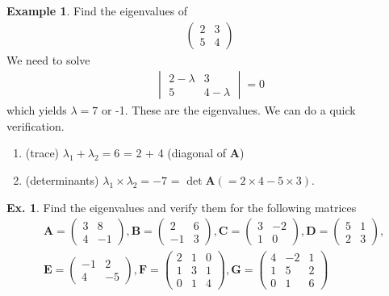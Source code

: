 \documentclass[11pt,a4paper]{book}
\theoremstyle{definition}\newtheorem{definition}{Definition}
\theoremstyle{definition}\newtheorem{fact}{Fact}
\theoremstyle{definition}\newtheorem{remark}{Remark}
\theoremstyle{definition}\newtheorem{ex}{Ex.}
\theoremstyle{definition}\newtheorem{project}{Project}
\theoremstyle{definition}\newtheorem{problem}{Problem}
\theoremstyle{definition}\newtheorem{example}{Example}
\numberwithin{theorem}{section}
\numberwithin{corollary}{chapter}
\numberwithin{assumption}{chapter}
\numberwithin{definition}{chapter}
\numberwithin{prop}{chapter}
\numberwithin{notation}{chapter}
\numberwithin{problem}{chapter}
\numberwithin{example}{chapter}
\numberwithin{fact}{chapter}
\numberwithin{ex}{chapter}
\def\E{\mathbb E}
\def\A{\mathbf A}
\def\B{\mathbf B}
\def\C{\mathbf C}
\def\D{\mathbf D}
\def\E{\mathbf E}
\def\F{\mathbf F}
\def\G{\mathbf G}
\begin{document}
	\begin{example}	
		Find the eigenvalues of 
		\begin{align*}
			\begin{pmatrix}
				2 & 3 \\ 5 & 4
			\end{pmatrix}
		\end{align*}
		We need to solve
		\begin{align*}
			\begin{vmatrix}
				2 - \lambda & 3 \\ 5 & 4-\lambda
			\end{vmatrix} = 0
		\end{align*}
		which yields $\lambda = 7$ or -1. These are the eigenvalues. We can do a quick verification.
		\begin{enumerate}
			\item (trace) $\lambda_1 + \lambda_2 = 6$ = 2 + 4 (diagonal of $\A$)
			\item (determinants) $\lambda_1 \times \lambda_2 = -7$ = $\det \A (=2\times 4 - 5\times 3)$.
		\end{enumerate}
	\end{example}
	
	
	\begin{ex}
		Find the eigenvalues and verify them for the following matrices
		\begin{align*}
			& \A = \begin{pmatrix}
				3 & 8 \\ 4 & - 1
			\end{pmatrix},  
			 \B = \begin{pmatrix}
				2 & 6 \\ - 1 & 3
			\end{pmatrix}, 
			 \C =\begin{pmatrix}
				3 & -2 \\
				1 &  0  
			\end{pmatrix}, 
			 \D = \begin{pmatrix}
				5 & 1 \\
				2 & 3  
			\end{pmatrix}, \\
			&  \E = \begin{pmatrix}
				-1 & 2 \\
				4  & -5  
			\end{pmatrix}, 
			\F = \begin{pmatrix}
				2 & 1 & 0 \\
				1 & 3 & 1 \\
				0 & 1 & 4
			\end{pmatrix}, 
			 \G = \begin{pmatrix}
				4 & -2 & 1 \\
				1 &  5 & 2 \\
				0 &  1 & 6
			\end{pmatrix}
		\end{align*}
	\end{ex}
	
\end{document}
